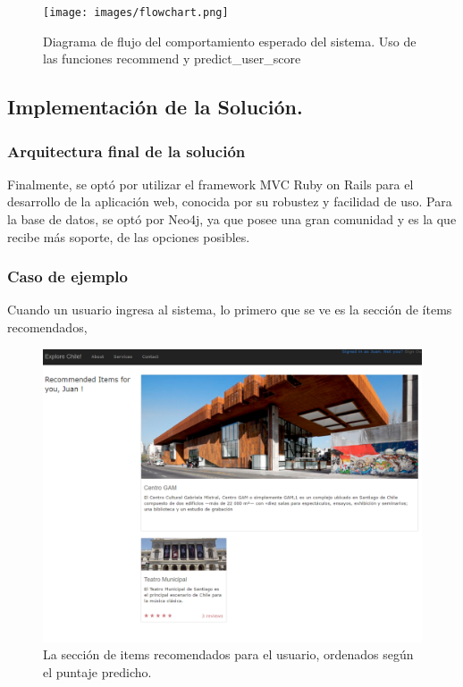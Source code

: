 \newpage

\begin{figure}[hbtp]
\centering
\texttt{[image: images/flowchart.png]}
\caption{Diagrama de flujo del comportamiento esperado del sistema. Uso de las funciones recommend y predict\_user\_score}
\end{figure}   


\subsection{Implementaci\'on de la Solución.}

\subsubsection{Arquitectura final de la solución}

Finalmente, se optó por utilizar el framework MVC Ruby on Rails para el desarrollo de la aplicación web, conocida por su robustez y facilidad de uso.
Para la base de datos, se optó por Neo4j, ya que posee una gran comunidad y es la que recibe más soporte, de las opciones posibles. 


\subsubsection{Caso de ejemplo}

Cuando un usuario ingresa al sistema, lo primero que se ve es la sección de ítems recomendados, 

\begin{figure}[hbtp]
\centering
\includegraphics[scale=0.7]{images/screen2.png}
\caption{La sección de items recomendados para el usuario, ordenados según el puntaje predicho.}
\end{figure} 

